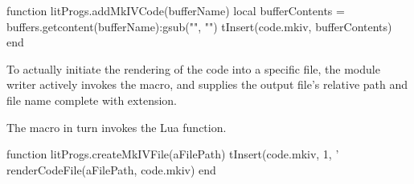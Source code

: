 function litProgs.addMkIVCode(bufferName)
  local bufferContents = buffers.getcontent(bufferName):gsub("", "\n")
  tInsert(code.mkiv, bufferContents)
end
\stopLuaCode

 
To actually initiate the rendering of the  code into a specific 
file, the module writer actively invokes the \type{\createMkIVFile} macro, 
and supplies the output file's relative path and file name complete with 
extension. 

\startMkIVCode
\def\createMkIVFile[#1]{
  \directlua{thirddata.literateProgs.createMkIVFile('#1')}
}
\stopMkIVCode

The \type{\createMkIVFile} macro in turn invokes the  
Lua function. 

\startLuaCode
function litProgs.createMkIVFile(aFilePath)
  tInsert(code.mkiv, 1, '%
  renderCodeFile(aFilePath, code.mkiv)
end
\stopLuaCode

\stopchapter